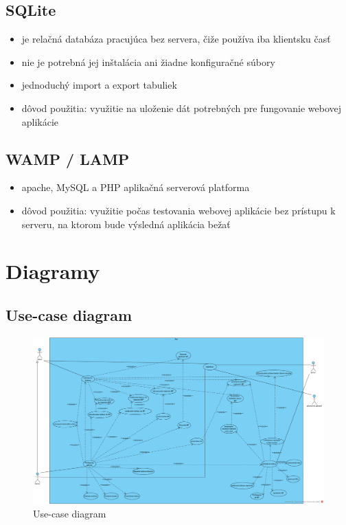 \documentclass[12pt,a4paper]{report}
\theoremstyle{definition}
\theoremstyle{remark}
\begin{document}
\section{SQLite}
\begin{itemize}
\item je relačná databáza pracujúca bez servera, čiže používa iba klientsku časť
\item nie je potrebná jej inštalácia ani žiadne konfiguračné súbory
\item jednoduchý import a export tabuliek
\item dôvod použitia: využitie na uloženie dát potrebných pre fungovanie webovej aplikácie
\end{itemize}

\section{WAMP / LAMP}
\begin{itemize}
\item apache, MySQL a PHP aplikačná serverová platforma
\item dôvod použitia: využitie počas testovania webovej aplikácie bez prístupu k serveru, na ktorom bude výsledná aplikácia bežať
\end{itemize}

\chapter{Diagramy}
\section{Use-case diagram}
\begin{figure}[h]
\centering
\includegraphics[width=\textwidth]{UseCaseDiagram1.png}
\caption{Use-case diagram}
\end{figure}
\end{document}

